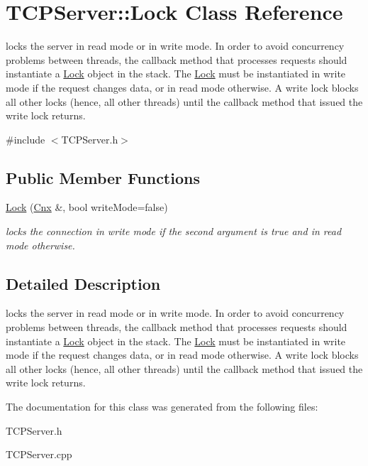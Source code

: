 \hypertarget{classTCPServer_1_1Lock}{\section{T\-C\-P\-Server\-:\-:Lock Class Reference}
\label{classTCPServer_1_1Lock}
}


locks the server in read mode or in write mode. In order to avoid concurrency problems between threads, the callback method that processes requests should instantiate a \hyperlink{classTCPServer_1_1Lock}{Lock} object in the stack. The \hyperlink{classTCPServer_1_1Lock}{Lock} must be instantiated in write mode if the request changes data, or in read mode otherwise. A write lock blocks all other locks (hence, all other threads) until the callback method that issued the write lock returns.  




{\ttfamily \#include $<$T\-C\-P\-Server.\-h$>$}

\subsection*{Public Member Functions}
\begin{DoxyCompactItemize}
\item 
\hypertarget{classTCPServer_1_1Lock_a4b1fa591dde407aacd93133828cfac81}{\hyperlink{classTCPServer_1_1Lock_a4b1fa591dde407aacd93133828cfac81}{Lock} (\hyperlink{classTCPServer_1_1Cnx}{Cnx} \&, bool write\-Mode=false)}\label{classTCPServer_1_1Lock_a4b1fa591dde407aacd93133828cfac81}

\begin{DoxyCompactList}\small\item\em locks the connection in write mode if the second argument is true and in read mode otherwise. \end{DoxyCompactList}\end{DoxyCompactItemize}


\subsection{Detailed Description}
locks the server in read mode or in write mode. In order to avoid concurrency problems between threads, the callback method that processes requests should instantiate a \hyperlink{classTCPServer_1_1Lock}{Lock} object in the stack. The \hyperlink{classTCPServer_1_1Lock}{Lock} must be instantiated in write mode if the request changes data, or in read mode otherwise. A write lock blocks all other locks (hence, all other threads) until the callback method that issued the write lock returns. 

The documentation for this class was generated from the following files\-:\begin{DoxyCompactItemize}
\item 
T\-C\-P\-Server.\-h\item 
T\-C\-P\-Server.\-cpp\end{DoxyCompactItemize}
